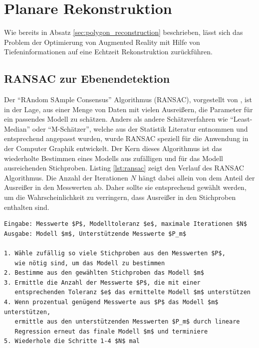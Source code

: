 \section{Planare Rekonstruktion}

Wie bereits in Absatz \ref{sec:polygon_reconstruction} beschrieben, lässt sich das Problem der Optimierung von Augmented Reality mit Hilfe von Tiefeninformationen auf eine Echtzeit Rekonstruktion zurückführen. 



\subsection{RANSAC zur Ebenendetektion}

Der \enquote{RAndom SAmple Consensus} Algorithmus (RANSAC), vorgestellt von \citet{fischler1981random}, ist in der Lage, aus einer Menge von Daten mit vielen Ausreißern, die Parameter für ein passendes Modell zu schätzen. Anders als andere Schätzverfahren wie \enquote{Least-Median} oder \enquote{M-Schätzer}, welche aus der Statistik Literatur entnommen und entsprechend angepasst wurden, wurde RANSAC speziell für die Anwendung in der Computer Graphik entwickelt. Der Kern dieses Algorithmus ist das wiederholte Bestimmen eines Modells aus zufälligen und für das Modell ausreichenden Stichproben. Listing \ref{lst:ransac} zeigt den Verlauf des RANSAC Algorithmus. Die Anzahl der Iterationen \(N\) hängt dabei allein von dem Anteil der Ausreißer in den Messwerten ab. Daher sollte sie entsprechend gewählt werden, um die Wahrscheinlichkeit zu verringern, dass Ausreißer in den Stichproben enthalten sind. \citep{derpanis2010overview} \\

\begin{lstlisting}[mathescape,caption=Der RANSAC Algorithmus, label=lst:ransac]
Eingabe: Messwerte $P$, Modelltoleranz $e$, maximale Iterationen $N$
Ausgabe: Modell $m$, Unterstützende Messwerte $P_m$

1. Wähle zufällig so viele Stichproben aus den Messwerten $P$,
   wie nötig sind, um das Modell zu bestimmen
2. Bestimme aus den gewählten Stichproben das Modell $m$
3. Ermittle die Anzahl der Messwerte $P$, die mit einer 
   entsprechenden Toleranz $e$ das ermittelte Modell $m$ unterstützen
4. Wenn prozentual genügend Messwerte aus $P$ das Modell $m$ unterstützen,
   ermittle aus den unterstützenden Messwerten $P_m$ durch lineare 
   Regression erneut das finale Modell $m$ und terminiere
5. Wiederhole die Schritte 1-4 $N$ mal
\end{lstlisting} 

